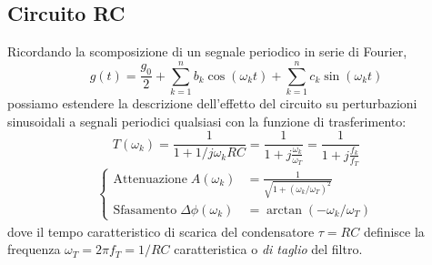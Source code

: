 \documentclass{article}[a4paper, oneside, 11pt]
\begin{document}
\subsection{Circuito RC}
Ricordando la scomposizione di un segnale periodico in serie di Fourier,
\begin{equation}
g(t) = \frac{g_0}{2} + \sum_{k=1}^{n} b_k \cos{(\omega_kt)} + 
\sum_{k=1}^{n} c_k\sin{\left(\omega_k t\right)}
\end{equation}
possiamo estendere la descrizione dell'effetto del circuito su perturbazioni
sinusoidali a segnali periodici qualsiasi con la funzione di trasferimento:
\begin{equation}
	T(\omega_k) = \frac{1}{1 + 1/j\omega_k RC} = 
	\frac{1}{1 + j\frac{\omega_k}{\omega_T}} = \frac{1}{1 + j\frac{f_k}{f_T}}
\end{equation}
\begin{align*}\label{eq:fin}
\begin{cases}
	\mathrm{Attenuazione} \; A(\omega_k) &=
	\frac{1}{\sqrt{1 + \left(\omega_k/\omega_T \right)^2}} \\
	\mathrm{Sfasamento} \; \Delta \phi(\omega_k) &=
	\arctan{\left(- \omega_k /\omega_T \right)}
\end{cases}
\end{align*}
dove il tempo caratteristico di scarica del condensatore $\tau = RC$ definisce
la frequenza $\omega_T = 2\pi f_T = 1/RC$ caratteristica o
\emph{di taglio} del filtro.
\medskip
\end{document}

